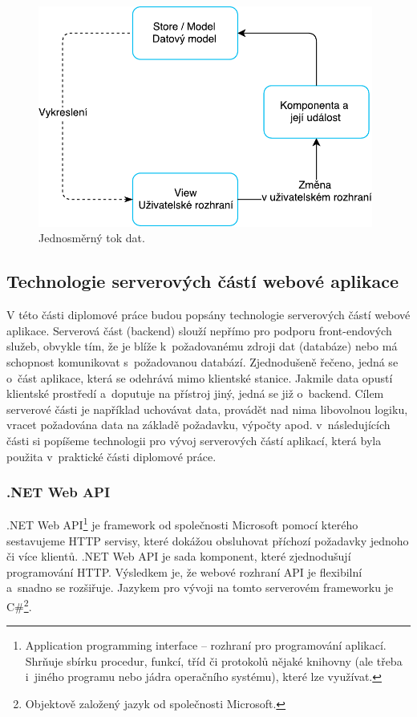 \begin{figure}[H]
	\centering
	\includegraphics[width=11cm]{../OneWayDataBinding.pdf}
	\caption{Jednosměrný tok dat.}
	\label{fig:rctOneWayDataFlow}
\end{figure}

\subsection{Technologie serverových částí webové aplikace}
\label{sec:backend}

V této části diplomové práce budou popsány technologie serverových částí webové aplikace. Serverová část (backend) slouží nepřímo pro podporu front-endových služeb, obvykle tím, že je blíže k~požadovanému zdroji dat (databáze) nebo má schopnost komunikovat s~požadovanou databází. Zjednodušeně řečeno, jedná se o~část aplikace, která se odehrává mimo klientské stanice. Jakmile data opustí klientské prostředí a~doputuje na přístroj jiný, jedná se již o~backend. Cílem serverové části je například uchovávat data, provádět nad nima libovolnou logiku, vracet požadována data na základě požadavku, výpočty apod. v~následujících části si popíšeme technologii pro vývoj serverových částí aplikací, která byla použita v~praktické části diplomové práce. 

\subsubsection{.NET Web API}
\label{sec:dotNET}

.NET Web API\footnote{Application programming interface -- rozhraní pro programování aplikací. Shrňuje sbírku procedur, funkcí, tříd či protokolů nějaké knihovny (ale třeba i~jiného programu nebo jádra operačního systému), které lze využívat.} je framework od společnosti Microsoft pomocí kterého sestavujeme HTTP servisy, které dokážou obsluhovat příchozí požadavky jednoho či více klientů. .NET Web API je sada komponent, které zjednodušují programování HTTP. Výsledkem je, že webové rozhraní API je flexibilní a~snadno se rozšiřuje. Jazykem pro vývoji na tomto serverovém frameworku je C\#\footnote{Objektově založený jazyk od společnosti Microsoft.}. \\

